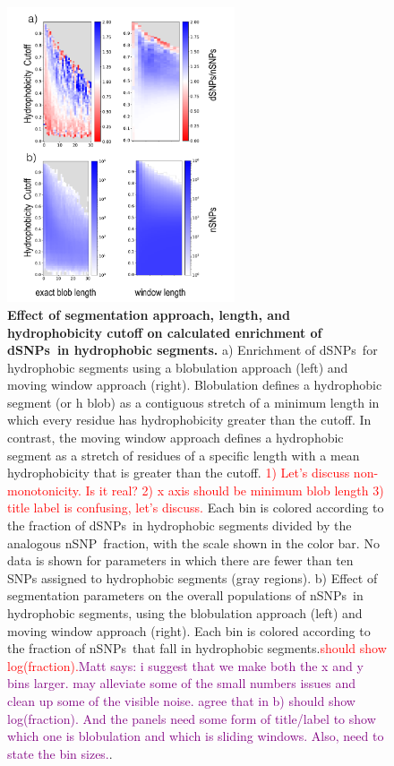 \documentclass[10pt,letterpaper]{article}
\newcommand{\dSNPs}{dSNPs~}
\newcommand{\nSNPs}{nSNPs~}
\newcommand{\nSNP}{nSNP~}
\newcommand{\grace}[1]{\textcolor{red}{#1}}
\newcommand{\matt}[1]{\textcolor{purple}{Matt says: #1}}
\begin{document}
\begin{figure}[!ht]
\includegraphics[scale=1,width=0.6\textwidth,trim={0 0cm 0 0cm},clip]{./figures/fig3.pdf}
\caption{{\bf Effect of segmentation approach, length, and hydrophobicity cutoff on calculated enrichment of \dSNPs in hydrophobic segments.} a) 
Enrichment of \dSNPs for hydrophobic segments using a blobulation approach (left) and moving window approach (right).  Blobulation defines a hydrophobic segment (or h blob) as a contiguous stretch of a minimum length in which every residue has hydrophobicity greater than the cutoff.  In contrast, the moving window approach defines a hydrophobic segment as a stretch of residues of a specific length with a mean hydrophobicity that is greater than the cutoff.  \grace{1) Let's discuss non-monotonicity.  Is it real? 2) x axis should be minimum blob length 3) title label is confusing, let's discuss. } Each bin is colored according to the fraction of \dSNPs in hydrophobic segments divided by the analogous \nSNP fraction, with the scale shown in the color bar. No data is shown for parameters in which there are fewer than ten SNPs assigned to hydrophobic segments (gray regions). b) Effect of segmentation parameters on the overall populations of \nSNPs in hydrophobic segments, using the blobulation approach (left) and moving window approach (right). Each bin is colored according to the fraction of \nSNPs that fall in hydrophobic segments.\grace{should show log(fraction).}\matt{i suggest that we make both the x and y bins larger. may alleviate some of the small numbers issues and clean up some of the visible noise. agree that in b) should show log(fraction). And the panels need some form of title/label to show which one is blobulation and which is sliding windows. Also, need to state the bin sizes.}.}
\label{blob_vs_window} 
\end{figure}
\end{document}
